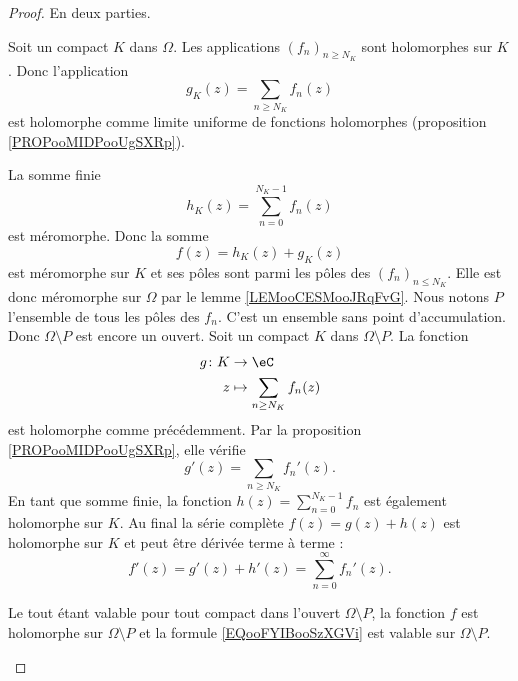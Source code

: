 \begin{proof}
	En deux parties.
	\begin{subproof}
		Soit un compact \( K\) dans \( \Omega\). Les applications \( (f_n)_{n\geq N_K}\) sont holomorphes sur \( K\). Donc l'application
		\begin{equation}
			g_K(z)=\sum_{n\geq N_K}f_n(z)
		\end{equation}
		est holomorphe comme limite uniforme de fonctions holomorphes (proposition \ref{PROPooMIDPooUgSXRp}).

		La somme finie
		\begin{equation}
			h_K(z)=\sum_{n=0}^{N_K-1}f_n(z)
		\end{equation}
		est méromorphe. Donc la somme
		\begin{equation}
			f(z)=h_K(z)+g_K(z)
		\end{equation}
		est méromorphe sur \( K\) et ses pôles sont parmi les pôles des \( (f_n)_{n\leq N_K}\). Elle est donc méromorphe sur \( \Omega\) par le lemme \ref{LEMooCESMooJRqFvG}.
		Nous notons \( P\) l'ensemble de tous les pôles des \( f_n\). C'est un ensemble sans point d'accumulation. Donc \( \Omega\setminus P\) est encore un ouvert. Soit un compact \( K\) dans \( \Omega\setminus P\). La fonction
		\begin{equation}
			\begin{aligned}
				g\colon K & \to \eC                        \\
				z         & \mapsto \sum_{n\geq N_K}f_n(z)
			\end{aligned}
		\end{equation}
		est holomorphe comme précédemment. Par la proposition \ref{PROPooMIDPooUgSXRp}, elle vérifie
		\begin{equation}
			g'(z)=\sum_{n\geq N_K}f_n'(z).
		\end{equation}
		En tant que somme finie, la fonction \( h(z)=\sum_{n=0}^{N_K-1}f_n\) est également holomorphe sur \( K\). Au final la série complète \( f(z)=g(z)+h(z)\) est holomorphe sur \( K\) et peut être dérivée terme à terme :
		\begin{equation}		\label{EQooFYIBooSzXGVi}
			f'(z)=g'(z)+h'(z)=\sum_{n=0}^{\infty}f_n'(z).
		\end{equation}

		Le tout étant valable pour tout compact dans l'ouvert \( \Omega\setminus P\), la fonction \( f\) est holomorphe sur \( \Omega\setminus P\) et la formule \eqref{EQooFYIBooSzXGVi} est valable sur \( \Omega\setminus P\).
	\end{subproof}
\end{proof}


